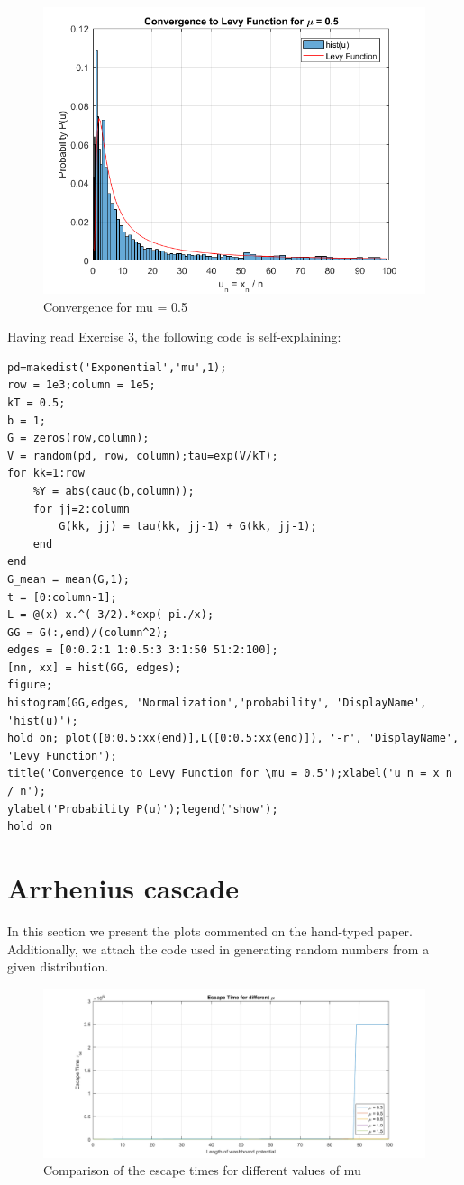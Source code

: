 \documentclass[11pt,letterpaper]{article}
\begin{document}
\begin{figure}
\centering
\includegraphics[width=0.9\linewidth]{./levy}
\caption{Convergence for mu = 0.5}
\label{fig:levy}
\end{figure}

Having read Exercise 3, the following code is self-explaining:
\begin{lstlisting}
pd=makedist('Exponential','mu',1);
row = 1e3;column = 1e5;
kT = 0.5;
b = 1;
G = zeros(row,column);
V = random(pd, row, column);tau=exp(V/kT);
for kk=1:row
    %Y = abs(cauc(b,column));
    for jj=2:column
        G(kk, jj) = tau(kk, jj-1) + G(kk, jj-1);
    end
end
G_mean = mean(G,1);
t = [0:column-1];
L = @(x) x.^(-3/2).*exp(-pi./x);
GG = G(:,end)/(column^2);
edges = [0:0.2:1 1:0.5:3 3:1:50 51:2:100];
[nn, xx] = hist(GG, edges);
figure;
histogram(GG,edges, 'Normalization','probability', 'DisplayName', 'hist(u)');
hold on; plot([0:0.5:xx(end)],L([0:0.5:xx(end)]), '-r', 'DisplayName', 'Levy Function');
title('Convergence to Levy Function for \mu = 0.5');xlabel('u_n = x_n / n');
ylabel('Probability P(u)');legend('show');
hold on
\end{lstlisting}


\newpage
\section{Arrhenius cascade}
In this section we present the plots commented on the hand-typed paper. Additionally, we attach the code used in generating random numbers from a given distribution.

\begin{figure}
\centering
\includegraphics[width=0.9\linewidth]{./escape_time1}
\caption{Comparison of the escape times for different values of mu}
\label{fig:escape_time1}
\end{figure}
\end{document}
